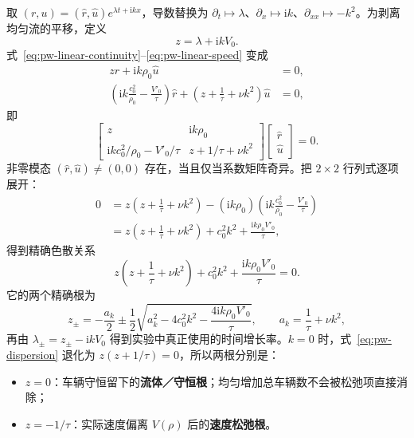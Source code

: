 \documentclass[11pt,a4paper,openany]{book}
\numberwithin{equation}{chapter}
\numberwithin{figure}{chapter}
\numberwithin{table}{chapter}
\begin{document}
取 $(r,u)=(\hat r,\hat u)e^{\lambda t+\mathrm{i}kx}$，导数替换为 $\partial_t\mapsto\lambda$、$\partial_x\mapsto\mathrm{i}k$、$\partial_{xx}\mapsto-k^2$。为剥离均匀流的平移，定义
\begin{equation}
z=\lambda+\mathrm{i}kV_0.
\label{eq:pw-z}
\end{equation}
式~\eqref{eq:pw-linear-continuity}--\eqref{eq:pw-linear-speed} 变成
\begin{align}
z\hat r+\mathrm{i}k\rho_0\hat u&=0,\\
\left(\mathrm{i}k\frac{c_0^2}{\rho_0}-\frac{V'_0}{\tau}\right)\hat r
+\left(z+\frac1\tau+\nu k^2\right)\hat u&=0,
\end{align}
即
\begin{equation}
\begin{bmatrix}
z & \mathrm{i}k\rho_0\\[2pt]
\mathrm{i}k c_0^2/\rho_0-V'_0/\tau & z+1/\tau+\nu k^2
\end{bmatrix}
\begin{bmatrix}\hat r\\ \hat u\end{bmatrix}=0.
\label{eq:pw-matrix}
\end{equation}
非零模态 $(\hat r,\hat u)\ne(0,0)$ 存在，当且仅当系数矩阵奇异。把 $2\times2$ 行列式逐项展开：
\begin{align}
0
&=z\left(z+\frac1\tau+\nu k^2\right)
-(\mathrm{i}k\rho_0)
\left(\mathrm{i}k\frac{c_0^2}{\rho_0}-\frac{V'_0}{\tau}\right)\\
&=z\left(z+\frac1\tau+\nu k^2\right)
+c_0^2k^2+\frac{\mathrm{i}k\rho_0V'_0}{\tau},
\end{align}
得到精确色散关系
\begin{equation}
z\left(z+\frac{1}{\tau}+\nu k^2\right)
+c_0^2k^2+\frac{\mathrm{i}k\rho_0V'_0}{\tau}=0.
\label{eq:pw-dispersion}
\end{equation}
它的两个精确根为
\begin{equation}
z_{\pm}
=-\frac{a_k}{2}
\pm\frac12\sqrt{a_k^2-4c_0^2k^2-
\frac{4\mathrm{i}k\rho_0V'_0}{\tau}},
\qquad a_k=\frac1\tau+\nu k^2,
\label{eq:pw-exact-roots}
\end{equation}
再由 $\lambda_\pm=z_\pm-\mathrm{i}kV_0$ 得到实验中真正使用的时间增长率。$k=0$ 时，式~\eqref{eq:pw-dispersion} 退化为 $z(z+1/\tau)=0$，所以两根分别是：
\begin{itemize}[leftmargin=1.4em,itemsep=2pt]
\item $z=0$：车辆守恒留下的\textbf{流体／守恒根}；均匀增加总车辆数不会被松弛项直接消除；
\item $z=-1/\tau$：实际速度偏离 $V(\rho)$ 后的\textbf{速度松弛根}。
\end{itemize}
\end{document}
